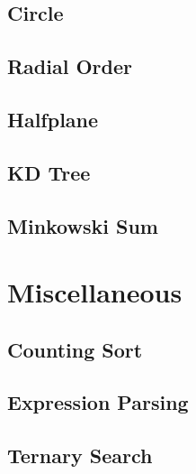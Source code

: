 \subsection{Circle}
\raggedbottom
\hrulefill
\subsection{Radial Order}
\raggedbottom
\hrulefill
\subsection{Halfplane}
\raggedbottom
\hrulefill
\subsection{KD Tree}
\raggedbottom
\hrulefill
\subsection{Minkowski Sum}
\raggedbottom
\hrulefill

\section{Miscellaneous}
\subsection{Counting Sort}
\raggedbottom
\hrulefill
\subsection{Expression Parsing}
\raggedbottom
\hrulefill
\subsection{Ternary Search}
\raggedbottom
\hrulefill

